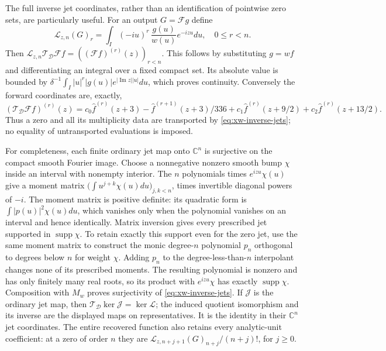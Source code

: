 The full inverse jet coordinates, rather than an identification of
pointwise zero sets, are particularly useful. For an output
$G=\mathscr Fg$ define
\begin{equation}
 \mathcal L_{z,n}(G)_r
     =\int_I(-iu)^r\,\frac{g(u)}{w(u)}e^{-izu}du,
       \quad 0\le r<n.
 \label{eq:xw-inverse-jets}
\end{equation}
Then
$\mathcal L_{z,n}\mathcal T_{\mathcal D}\mathscr Ff
 =((\mathscr Ff)^{(r)}(z))_{r<n}$.
This follows by substituting $g=wf$ and differentiating an integral
over a fixed compact set. Its absolute value is bounded by
$\delta^{-1}\int_I |u|^r|g(u)|e^{|\operatorname{Im}z||u|}du$,
which proves continuity.
Conversely the forward coordinates are, exactly,
\[
 (\mathcal T_{\mathcal D}\mathscr Ff)^{(r)}(z)
  =c_0\widehat f^{(r)}(z+3)-\widehat f^{(r+1)}(z+3)/336
    +c_1\widehat f^{(r)}(z+9/2)+c_2\widehat f^{(r)}(z+13/2).
\]
Thus a zero and all its multiplicity data are transported by
\eqref{eq:xw-inverse-jets}; no equality of untransported evaluations
is imposed.

For completeness, each finite ordinary jet map onto $\mathbb C^n$
is surjective on the compact smooth Fourier image. Choose a
nonnegative nonzero smooth bump $\chi$ inside an interval with
nonempty interior. The $n$ polynomials times
$e^{izu}\chi(u)$ give a moment matrix
$\bigl(\int u^{j+k}\chi(u)du\bigr)_{j,k<n}$, times invertible
diagonal powers of $-i$. The moment matrix is positive definite:
its quadratic form is $\int|p(u)|^2\chi(u)du$, which vanishes only
when the polynomial vanishes on an interval and hence identically.
Matrix inversion gives every prescribed jet supported in
$\operatorname{supp}\chi$. To retain exactly this support even
for the zero jet, use the same moment matrix to construct the
monic degree-$n$ polynomial $p_n$ orthogonal to degrees below $n$
for weight $\chi$. Adding $p_n$ to the degree-less-than-$n$
interpolant changes none of its prescribed moments. The resulting
polynomial is nonzero and has only finitely many real roots, so
its product with $e^{izu}\chi$ has exactly $\operatorname{supp}\chi$.
Composition with $M_w$ proves surjectivity of
\eqref{eq:xw-inverse-jets}. If $\mathcal J$ is the ordinary jet
map, then $\mathcal T_{\mathcal D}\ker\mathcal J=\ker\mathcal L$;
the induced quotient isomorphism and its inverse are the displayed
maps on representatives. It is the identity in their $\mathbb C^n$
jet coordinates. The entire recovered function also retains every
analytic-unit coefficient: at a zero of order $n$ they are
$\mathcal L_{z,n+j+1}(G)_{n+j}/(n+j)!$, for $j\ge0$.

